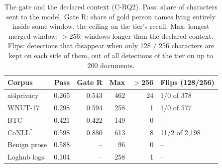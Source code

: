 \begin{table}[t]
\caption{The gate and the declared context (C-RQ2). Pass: share of characters sent to the model. Gate R: share of gold person names lying entirely inside some window, the ceiling on the tier's recall. Max: longest merged window; $>$256: windows longer than the declared context. Flips: detections that disappear when only 128 / 256 characters are kept on each side of them, out of all detections of the tier on up to 200 documents.}\label{tab:gate}
\centering\footnotesize\setlength{\tabcolsep}{4pt}
\begin{tabular}{@{}l r r r r l@{}}
\toprule
Corpus & Pass & Gate R & Max & $>$256 & Flips (128/256) \\
\midrule
ai4privacy & 0.265 & 0.543 & 462 & 24 & 1/0 of 378 \\
WNUT-17 & 0.298 & 0.594 & 258 & 1 & 1/0 of 577 \\
BTC & 0.421 & 0.422 & 149 & 0 & -- \\
CoNLL$^\ast$ & 0.598 & 0.880 & 613 & 8 & 11/2 of 2,198 \\
Benign prose & 0.588 & -- & 96 & 0 & -- \\
Loghub logs & 0.104 & -- & 258 & 1 & -- \\
\bottomrule
\end{tabular}
\end{table}
